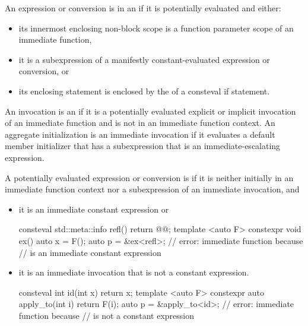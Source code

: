 \pnum
An expression or conversion is in an 
if it is potentially evaluated and either:
\begin{itemize}
\item
its innermost enclosing non-block scope is
a function parameter scope of an immediate function,
\item
it is a subexpression of a manifestly constant-evaluated expression
or conversion, or
\item
its enclosing statement is enclosed by
the  of a consteval if statement.
\end{itemize}
An invocation is an 
if it is a potentially evaluated explicit or implicit invocation of
an immediate function and
is not in an immediate function context.
An aggregate initialization is an immediate invocation
if it evaluates a default member initializer
that has a subexpression that is an immediate-escalating expression.

\pnum
{}%
%
%
%
A potentially evaluated expression or conversion is 
if it is neither initially in an immediate function context
nor a subexpression of an immediate invocation, and
\begin{itemize}
\item
it is an immediate constant expression or
\begin{example}
\begin{codeblock}
consteval std::meta::info refl() { return @@; }
template <auto F> constexpr void ex() { auto x = F(); }
auto p = &ex<refl>;             // error: immediate function because 
                                // is an immediate constant expression
\end{codeblock}
\end{example}
\item
it is an immediate invocation that is not a constant expression.
\begin{example}
\begin{codeblock}
consteval int id(int x) { return x; }
template <auto F> constexpr auto apply_to(int i) { return F(i); }
auto p = &apply_to<id>;         // error: immediate function because 
                                // is not a constant expression
\end{codeblock}
\end{example}
\end{itemize}

